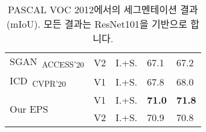 \begin{table}[]
{\begin{tabular}{@{}lccll@{}}
\multicolumn{1}{l}{SGAN~\cite{yao2020saliency}\textsubscript{ACCESS'20}}                & V2        & I.+S. & 67.1                    & 67.2                     \\
\multicolumn{1}{l}{ICD~\cite{fan2020learning}\textsubscript{CVPR'20}}                   & V1        & I.+S. & 67.8                    & 68.0                     \\ \midrule
\multicolumn{1}{l}{\multirow{2}{*}{Our EPS}}                                            & V1        & I.+S. & \textbf{71.0}           & \textbf{71.8}            \\
\multicolumn{1}{l}{}                                                                    & V2        & I.+S. & 70.9                    & 70.8                     \\ \bottomrule
\end{tabular}
}
\vspace{2mm}
\caption{PASCAL VOC 2012에서의 세그멘테이션 결과 (mIoU). 모든 결과는 ResNet101을 기반으로 합니다.}\vspace{-2mm}
\label{tab:seg_quan_voc_resnet101}
\end{table}
